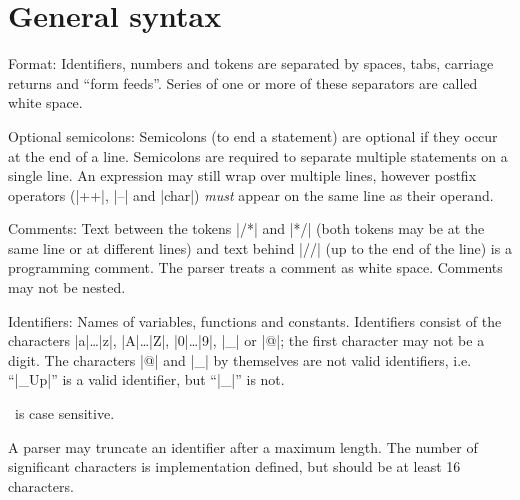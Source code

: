 \vfill\eject
{}%

\chapter{General syntax}
 

\beginlist{35pt} \halflineskip
\item Format:
        Identifiers, numbers and tokens are separated by spaces, tabs,
        carriage returns and ``form feeds''. Series of one or more of these
        separators are called white space. 

\item Optional semicolons:  
        \noindent{} %
        Semicolons (to end a statement) are optional if they occur at the end
        of a line. Semicolons are required to separate multiple statements on
        a single line. An expression may still wrap over multiple lines, however
        postfix operators (|++|, |--| and |char|) {\it must\/} appear on the
        same line as their operand.

\item Comments:   
        Text between the tokens |/*| and |*/| (both tokens may be at the same
        line or at different lines) and text behind |//| (up to the end of the
        line) is a programming comment. The parser treats a comment as white
        space. Comments may not be nested.

\item Identifiers:  
        Names of variables, functions and constants. Identifiers consist of the
        characters |a|\dots |z|, |A|\dots |Z|, |0|\dots |9|, |_| or |@|; the
        first character may not be a digit. The characters |@| and |_| by
        themselves are not valid identifiers, i.e. ``|_Up|'' is a valid
        identifier, but ``|_|'' is not.

        \Small\ is case sensitive.

        A parser may truncate an identifier after a maximum length. The
        number of significant characters is implementation defined, but should
        be at least 16 characters.

